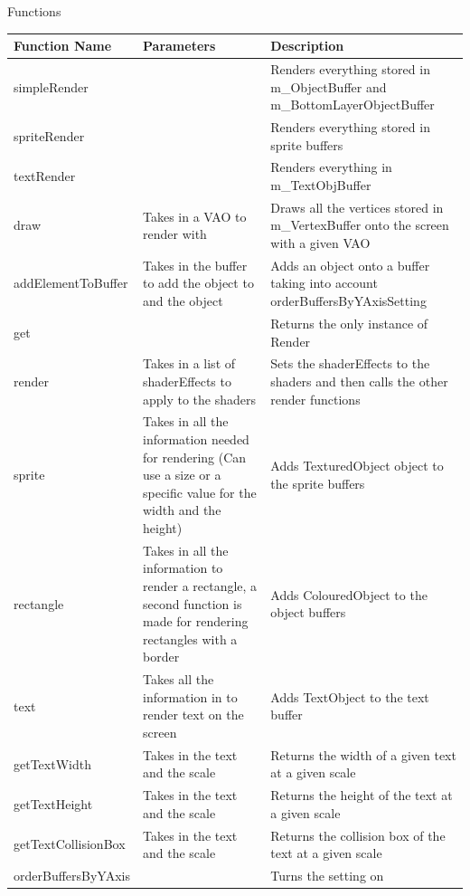 \documentclass[../../Main.tex]{subfiles}
\begin{document}
\begin{center}
\begin{tabular}{ | m{} | m{} | }
            \hline
        \end{tabular}
        Functions
        \begin{tabular}{ | m{} | m{}| m{} | }
            \hline
            \textbf{Function Name} & \textbf{Parameters} & \textbf{Description} \\
            \hline
            simpleRender & & Renders everything stored in m\_ObjectBuffer and m\_BottomLayerObjectBuffer \\
            \hline
            spriteRender & & Renders everything stored in sprite buffers \\
            \hline
            textRender & & Renders everything in m\_TextObjBuffer \\
            \hline
            draw & Takes in a VAO to render with & Draws all the vertices stored in m\_VertexBuffer onto the screen with a given VAO \\
            \hline
            addElementToBuffer & Takes in the buffer to add the object to and the object & Adds an object onto a buffer taking into account orderBuffersByYAxisSetting \\
            \hline
            get & & Returns the only instance of Render \\
            \hline
            render & Takes in a list of shaderEffects to apply to the shaders & Sets the shaderEffects to the shaders and then calls the other render functions \\
            \hline
            sprite & Takes in all the information needed for rendering (Can use a size or a specific value for the width and the height) & Adds TexturedObject object to the sprite buffers \\
            \hline
            rectangle & Takes in all the information to render a rectangle, a second function is made for rendering rectangles with a border & Adds ColouredObject to the object buffers \\
            \hline
            text & Takes all the information in to render text on the screen & Adds TextObject to the text buffer\\
            \hline
            getTextWidth & Takes in the text and the scale & Returns the width of a given text at a given scale \\
            \hline
            getTextHeight & Takes in the text and the scale & Returns the height of the text at a given scale \\
            \hline
            getTextCollisionBox & Takes in the text and the scale & Returns the collision box of the text at a given scale \\
            \hline
            orderBuffersByYAxis & & Turns the setting on \\
            \hline
        \end{tabular}
    \end{center}
\end{document}
